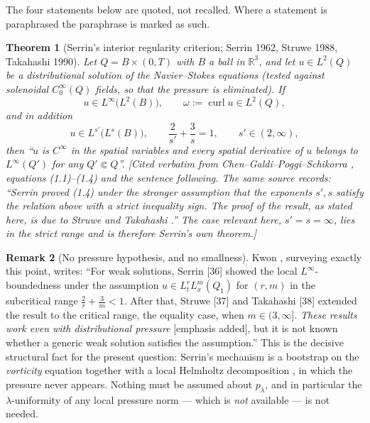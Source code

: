 \documentclass[11pt]{article}
\newtheorem{theorem}{Theorem}[section]
\theoremstyle{definition}
\newtheorem{remark}[theorem]{Remark}
\theoremstyle{remark}
\newcommand{\R}{\mathbb{R}}
\newcommand{\curl}{\operatorname{curl}}
\begin{document}
The four statements below are quoted, not recalled. Where a statement is
paraphrased the paraphrase is marked as such.

\begin{theorem}[Serrin's interior regularity criterion; Serrin 1962,
  Struwe 1988, Takahashi 1990]\label{thm:s48-serrin}
  Let $Q=B\times(0,T)$ with $B$ a ball in $\R^3$, and let $u\in L^2(Q)$ be a
  distributional solution of the Navier--Stokes equations (tested against
  solenoidal $C_0^\infty(Q)$ fields, so that the pressure is eliminated). If
  \[
    u\in L^\infty\bigl(L^2(B)\bigr),\qquad \omega:=\curl u\in L^2(Q),
  \]
  and in addition
  \[
    u\in L^{s'}\bigl(L^{s}(B)\bigr),\qquad \frac{2}{s'}+\frac{3}{s}=1,
    \qquad s'\in(2,\infty),
  \]
  then \emph{``$u$ is $C^\infty$ in the spatial variables and every spatial
  derivative of $u$ belongs to $L^\infty(Q')$ for any $Q'\Subset Q$''}.
  \emph{[Cited verbatim from Chen--Galdi--Poggi--Schikorra
  \cite{ChenGaldiPoggiSchikorra2026}, equations (1.1)--(1.4) and the sentence
  following. The same source records: ``Serrin proved (1.4) under the stronger
  assumption that the exponents $s',s$ satisfy the relation above with a
  strict inequality sign. The proof of the result, as stated here, is due to
  Struwe \cite{Struwe1988} and Takahashi \cite{Takahashi1990}.'' The case
  relevant here, $s'=s=\infty$, lies in the \emph{strict} range and is
  therefore Serrin's own theorem.]}
\end{theorem}

\begin{remark}[No pressure hypothesis, and no smallness]
  \label{rem:s48-no-pressure}
  Kwon \cite{Kwon2021}, surveying exactly this point, writes: ``For weak
  solutions, Serrin [36] showed the local $L^\infty$-boundedness under the
  assumption $u\in L^r_tL^m_x(Q_1)$ for $(r,m)$ in the subcritical range
  $\frac{2}{r}+\frac{3}{m}<1$. After that, Struwe [37] and Takahashi [38]
  extended the result to the critical range, the equality case, when
  $m\in(3,\infty]$. \emph{These results work even with distributional
  pressure} \textup{[emphasis added]}, but it is not known whether a generic
  weak solution satisfies the assumption.'' This is the decisive structural
  fact for the present question: Serrin's mechanism is a bootstrap on the
  \emph{vorticity} equation together with a local Helmholtz decomposition
  \cite[(1.5)--(1.7)]{ChenGaldiPoggiSchikorra2026}, in which the pressure
  never appears. Nothing must be assumed about $p_\lambda$, and in particular
  the $\lambda$-uniformity of any local pressure norm --- which is
  \emph{not} available --- is not needed.
\end{remark}
\end{document}
